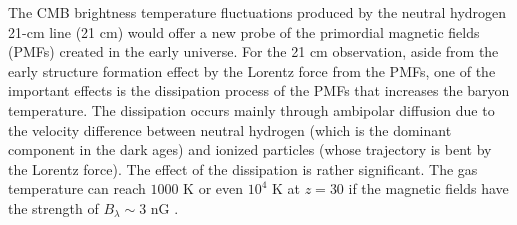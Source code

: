 \documentclass{PoS}
\begin{document}
The CMB brightness temperature fluctuations produced by the neutral
hydrogen 21-cm line (21 cm) would offer a new probe of the primordial
magnetic fields (PMFs) created in the early universe. For the 21 cm
observation, aside from the early structure formation effect by the
Lorentz force from the PMFs, one of the important effects is the
dissipation process of the PMFs that increases the baryon
temperature. The dissipation occurs mainly through ambipolar
diffusion due to the velocity difference between neutral hydrogen (which
is the dominant component in the dark ages) and ionized particles (whose
trajectory is bent by the Lorentz force).  The effect of the dissipation
is rather significant. The gas temperature can reach $1000$ K or even
$10^4$ K at $z=30$ if the magnetic fields have the strength of
$B_\lambda \sim 3$ nG
\citep{2005MNRAS.356..778S,2006MNRAS.372.1060T,2009ApJ...692..236S,2014JCAP...01..009K}.
\end{document}
